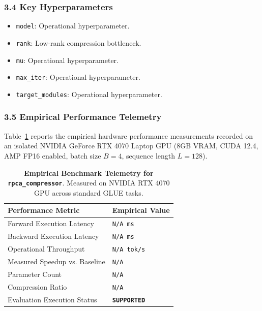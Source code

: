 \subsubsection*{3.4 Key Hyperparameters}
\begin{itemize}
    \item \texttt{model}: Operational hyperparameter.
    \item \texttt{rank}: Low-rank compression bottleneck.
    \item \texttt{mu}: Operational hyperparameter.
    \item \texttt{max\_iter}: Operational hyperparameter.
    \item \texttt{target\_modules}: Operational hyperparameter.
\end{itemize}

\subsubsection*{3.5 Empirical Performance Telemetry}
Table~\ref{tab:telemetry_rpca_compressor} reports the empirical hardware performance measurements recorded on an isolated NVIDIA GeForce RTX 4070 Laptop GPU (8GB VRAM, CUDA 12.4, AMP FP16 enabled, batch size $B=4$, sequence length $L=128$).

\begin{table}[h]
\centering
\small
\caption{\textbf{Empirical Benchmark Telemetry for \texttt{rpca\_compressor}}. Measured on NVIDIA RTX 4070 GPU across standard GLUE tasks.}
\label{tab:telemetry_rpca_compressor}
\begin{tabularx}{\columnwidth}{lX}
\toprule
\textbf{Performance Metric} & \textbf{Empirical Value} \\
\midrule
Forward Execution Latency & \texttt{N/A ms} \\
Backward Execution Latency & \texttt{N/A ms} \\
Operational Throughput & \texttt{N/A tok/s} \\
Measured Speedup vs. Baseline & \texttt{N/A} \\
Parameter Count & \texttt{N/A} \\
Compression Ratio & \texttt{N/A} \\
Evaluation Execution Status & \textbf{\texttt{SUPPORTED}} \\
\bottomrule
\end{tabularx}
\end{table}

